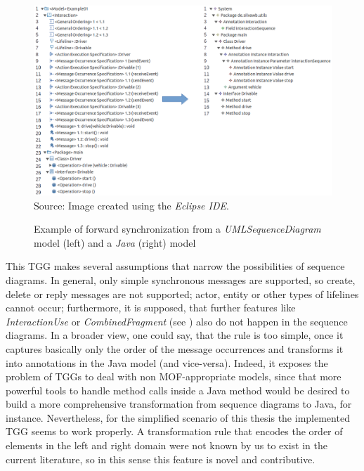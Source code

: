 \documentclass[tuberlin,cic,tc,english,noabntcite, oneside]{iiufrgs}
\begin{document}
\begin{figure}[h]
	\centering
    \caption{Example of forward synchronization from a \emph{UMLSequenceDiagram} model (left) and a \emph{Java} (right) model}
    \includegraphics[width=\textwidth]{umlSequenceDiagram2java_Example01} \\
    Source: Image created using the \emph{Eclipse IDE}.
    \label{fig:umlSequenceDiagram2java_Example01}
\end{figure}

This TGG makes several assumptions that narrow the possibilities of sequence diagrams. In general, only simple synchronous messages are supported, so create, delete or reply messages are not supported; actor, entity or other types of lifelines cannot occur; furthermore, it is supposed, that further features like \emph{InteractionUse} or \emph{CombinedFragment} (see \citep[p. 621 and p. 630]{omg2015meta}) also do not happen in the sequence diagrams. In a broader view, one could say, that the rule is too simple, once it captures basically only the order of the message occurrences and transforms it into annotations in the Java model (and vice-versa). Indeed, it exposes the problem of TGGs to deal with non MOF-appropriate models, since that more powerful tools to handle method calls inside a Java method would be desired to build a more comprehensive transformation from sequence diagrams to Java, for instance. Nevertheless, for the simplified scenario of this thesis the implemented TGG seems to work properly. A transformation rule that encodes the order of elements in the left and right domain were not known by us to exist in the current literature, so in this sense this feature is novel and contributive.
\end{document}
